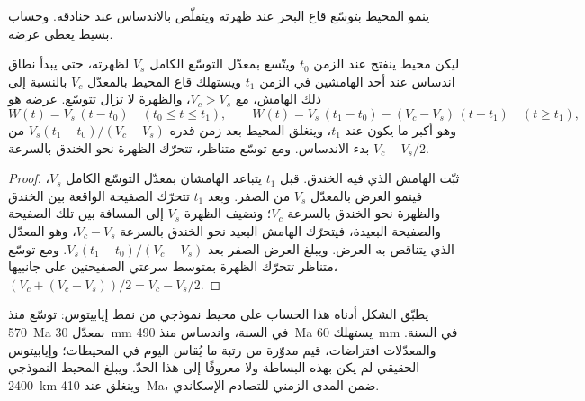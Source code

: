 ينمو المحيط بتوسّع قاع البحر عند ظهرته ويتقلّص بالاندساس عند خنادقه.
وحساب بسيط يعطي عرضه.

\begin{proposition}\label{prop:b2:wilson-cycle:width}
ليكن محيط ينفتح عند الزمن $t_0$ ويتّسع بمعدّل التوسّع الكامل $V_s$ لظهرته، حتى يبدأ
نطاق اندساس عند أحد الهامشين في الزمن $t_1$ ويستهلك قاع المحيط بالمعدّل $V_c$
بالنسبة إلى ذلك الهامش، مع $V_c > V_s$، والظهرة لا تزال تتوسّع. عرضه هو
\[
  W(t) = V_s\,(t - t_0) \quad (t_0 \le t \le t_1), \qquad
  W(t) = V_s\,(t_1 - t_0) - (V_c - V_s)\,(t - t_1) \quad (t \ge t_1),
\]
وهو أكبر ما يكون عند $t_1$، وينغلق المحيط بعد زمن قدره $V_s(t_1 - t_0)/(V_c - V_s)$ من بدء
الاندساس. ومع توسّع متناظر، تتحرّك الظهرة نحو الخندق بالسرعة $V_c - V_s/2$.
\end{proposition}

\begin{proof}
ثبّت الهامش الذي فيه الخندق. قبل $t_1$ يتباعد الهامشان بمعدّل
التوسّع الكامل $V_s$، فينمو العرض بالمعدّل $V_s$ من الصفر. وبعد $t_1$ تتحرّك الصفيحة الواقعة بين
الخندق والظهرة نحو الخندق بالسرعة $V_c$؛ وتضيف الظهرة $V_s$ إلى المسافة
بين تلك الصفيحة والصفيحة البعيدة، فيتحرّك الهامش البعيد نحو الخندق بالسرعة $V_c - V_s$،
وهو المعدّل الذي يتناقص به العرض. ويبلغ العرض الصفر بعد $V_s(t_1 - t_0)/(V_c -
V_s)$. ومع توسّع متناظر تتحرّك الظهرة بمتوسط سرعتي الصفيحتين على
جانبيها، $(V_c + (V_c - V_s))/2 = V_c - V_s/2$.
\end{proof}

يطبّق الشكل أدناه هذا الحساب على محيط نموذجي من نمط إيابيتوس: توسّع منذ
\qty{570}{Ma} بمعدّل \qty{30}{mm} في السنة، واندساس منذ \qty{490}{Ma} يستهلك \qty{60}{mm} في
السنة. والمعدّلات افتراضات، قيم مدوّرة من رتبة ما يُقاس اليوم في المحيطات؛
وإيابيتوس الحقيقي لم يكن بهذه البساطة ولا معروفًا إلى هذا الحدّ. ويبلغ المحيط النموذجي \qty{2400}{km}
وينغلق عند \qty{410}{Ma}، ضمن المدى الزمني للتصادم الإسكاندي.

